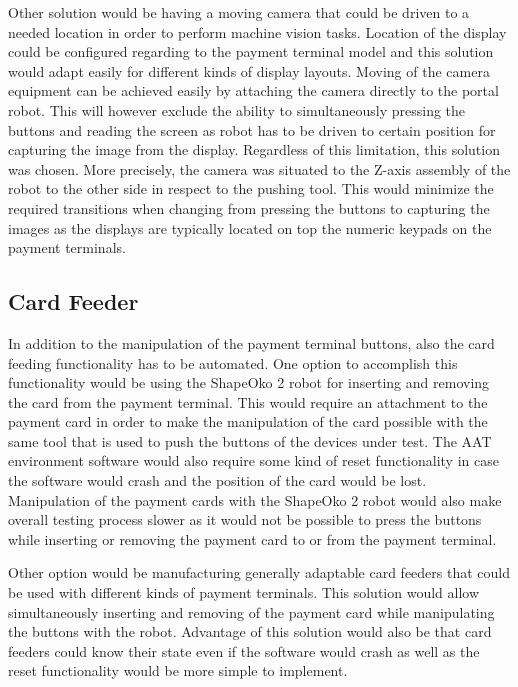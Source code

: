 Other solution would be having a moving camera that could be driven to a needed location in order to perform machine vision tasks. Location of the display could be configured regarding to the payment terminal model and this solution would adapt easily for different kinds of display layouts. Moving of the camera equipment can be achieved easily by attaching the camera directly to the portal robot. This will however exclude the ability to simultaneously pressing the buttons and reading the screen as robot has to be driven to certain position for capturing the image from the display. Regardless of this limitation, this solution was chosen. More precisely, the camera was situated to the Z-axis assembly of the robot to the other side in respect to the pushing tool. This would minimize the required transitions when changing from pressing the buttons to capturing the images as the displays are typically located on top the numeric keypads on the payment terminals.

\FloatBarrier
\subsection{Card Feeder}
\label{subsection:Card feeder}

In addition to the manipulation of the payment terminal buttons, also the card feeding functionality has to be automated. One option to accomplish this functionality would be using the ShapeOko 2 robot for inserting and removing the card from the payment terminal. This would require an attachment to the payment card in order to make the manipulation of the card possible with the same tool that is used to push the buttons of the devices under test. The AAT environment software would also require some kind of reset functionality in case the software would crash and the position of the card would be lost. Manipulation of the payment cards with the ShapeOko 2 robot would also make overall testing process slower as it would not be possible to press the buttons while inserting or removing the payment card to or from the payment terminal.

Other option would be manufacturing generally adaptable card feeders that could be used with different kinds of payment terminals. This solution would allow simultaneously inserting and removing of the payment card while manipulating the buttons with the robot. Advantage of this solution would also be that card feeders could know their state even if the software would crash as well as the reset functionality would be more simple to implement.

